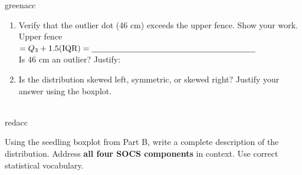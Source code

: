 \documentclass[10pt]{article}
\begin{document}
\begin{blurbbox}{greenacc}
\begin{enumerate}[leftmargin=1.5em, itemsep=8pt]
  \item Verify that the outlier dot (46 cm) exceeds the upper fence.
        Show your work.\\[5pt]
        Upper fence $= Q_3 + 1.5(\text{IQR}) = \blank{7cm}$\\[4pt]
        Is 46 cm an outlier? \blank{2cm} \quad Justify: \blank{5cm}

  \item Is the distribution skewed left, symmetric, or skewed right?
        Justify your answer using the boxplot.\\[5pt]
        \writeline\\[1pt]\writeline

\end{enumerate}

\end{blurbbox}

\vspace{0.12in}

\boxguard
\begin{blurbbox}{redacc}
\small

Using the seedling boxplot from Part B, write a complete description of the
distribution. Address \textbf{all four SOCS components} in context.
Use correct statistical vocabulary.

\vspace{0.08in}
\writeline\\[1pt]\writeline\\[1pt]\writeline\\[1pt]
\writeline\\[1pt]\writeline\\[1pt]\writeline

\end{blurbbox}
\end{document}
